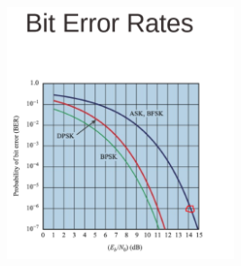 \documentclass[11pt]{article}
\begin{document}
\begin{enumerate}[label=(\alph*)]
\begin{center}
    \includegraphics[width=0.5\textwidth]{1ga}
\end{center}

\end{enumerate}
 
\end{document}
